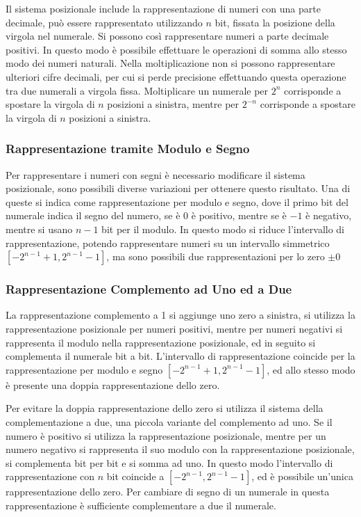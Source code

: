 \documentclass{article}
\numberwithin{equation}{subsection}
\begin{document}
Il sistema posizionale include la rappresentazione di numeri con una parte decimale, può essere rappresentato utilizzando $n$ bit, fissata la posizione della virgola nel 
numerale. Si possono così rappresentare numeri a parte decimale positivi. In questo modo è possibile effettuare le operazioni di somma allo stesso modo dei numeri naturali. 
Nella moltiplicazione non si possono rappresentare ulteriori cifre decimali, per cui si perde precisione effettuando questa operazione tra due numerali a virgola fissa. 
Moltiplicare un numerale per $2^n$ corrisponde a spostare la virgola di $n$ posizioni a sinistra, mentre per $2^{-n}$ corrisponde a spostare la virgola di $n$ posizioni a 
sinistra. 

\subsubsection{Rappresentazione tramite Modulo e Segno}
Per rappresentare i numeri con segni è necessario modificare il sistema posizionale, sono possibili diverse variazioni per ottenere questo risultato. 
Una di queste si indica 
come rappresentazione per modulo e segno, dove il primo bit del numerale indica il segno del numero, se è $0$ è positivo, mentre se è $-1$ è negativo, mentre si usano $n-1$ bit 
per il modulo. In questo modo si riduce l'intervallo di rappresentazione, potendo rappresentare numeri su un intervallo simmetrico $[-2^{n-1}+1,2^{n-1}-1]$, ma sono 
possibili due rappresentazioni per lo zero $\pm0$

\subsubsection{Rappresentazione Complemento ad Uno ed a Due}
La rappresentazione complemento a 1 si aggiunge uno zero a sinistra, si utilizza la rappresentazione posizionale per numeri positivi, mentre per numeri negativi si rappresenta 
il modulo nella rappresentazione posizionale, ed in seguito si complementa il numerale bit a bit. L'intervallo di rappresentazione coincide per la rappresentazione per modulo e segno 
$[-2^{n-1}+1,2^{n-1}-1]$, ed allo stesso modo è presente una doppia rappresentazione dello zero. 


Per evitare la doppia rappresentazione dello zero si utilizza il sistema della complementazione a due, una piccola variante del complemento ad uno. Se il numero è positivo si 
utilizza la rappresentazione posizionale, mentre per un numero negativo si rappresenta il suo modulo con la rappresentazione posizionale, si complementa bit per bit e si somma ad 
uno. In questo modo l'intervallo di rappresentazione con $n$ bit coincide a $[-2^{n-1},2^{n-1}-1]$, ed è possibile un'unica rappresentazione dello zero. Per cambiare di segno 
di un numerale in questa rappresentazione è sufficiente complementare a due il numerale. 
\end{document}
